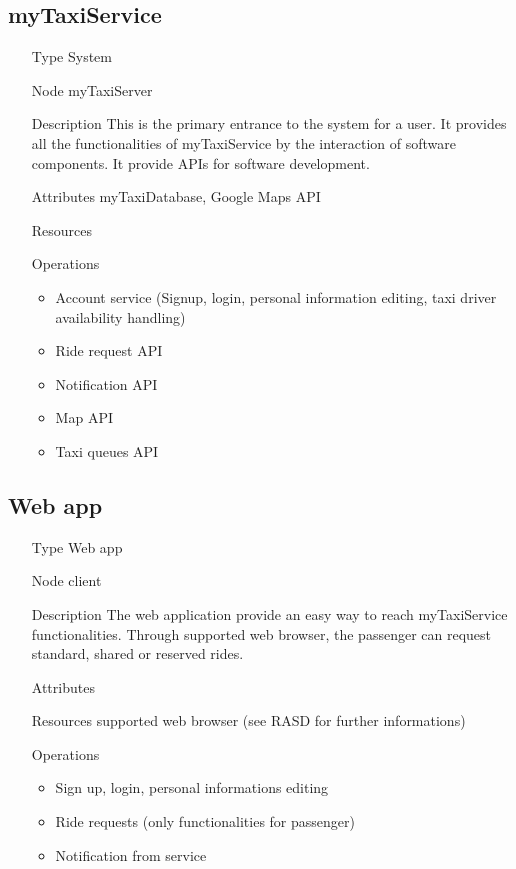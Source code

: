 \subsection{myTaxiService}
\begin{itemize}
	\item[Type] System
	\item[Node] myTaxiServer
	\item[Description] This is the primary entrance to the system for a user. It provides all the functionalities of myTaxiService by the interaction of software components. It provide APIs for software development.
	\item[Attributes] myTaxiDatabase, Google Maps API
	\item[Resources] 
	\item[Operations]\begin{itemize}
		\item Account service (Signup, login, personal information editing, taxi driver availability handling)
		\item Ride request API 
		\item Notification API
		\item Map API
		\item Taxi queues API
	\end{itemize}
\end{itemize}

\subsection{Web app}
\begin{itemize}
	\item[Type] Web app
	\item[Node] client
	\item[Description] The web application provide an easy way to reach myTaxiService functionalities. Through supported web browser, the passenger can request standard, shared or reserved rides.
	\item[Attributes]
	\item[Resources] supported web browser (see RASD for further informations)
	\item[Operations]\begin{itemize}
		\item Sign up, login, personal informations editing
		\item Ride requests (only functionalities for passenger)
		\item Notification from service
	\end{itemize}
\end{itemize}

